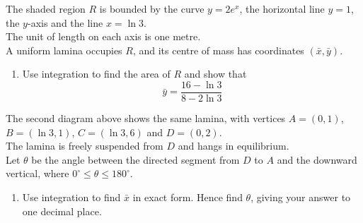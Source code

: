 \documentclass[leqno]{article}
\begin{document}
\begin{enumerate}[
  label=\textbf{\arabic*.},
  leftmargin=*,
  topsep=0pt,
  partopsep=0pt,
  parsep=0pt
]
\begin{figure}[H]
    \centering
{}
\end{figure}


The shaded region $R$ is bounded by the curve $y=2e^x$, the horizontal line $y=1$, the $y$-axis and the line $x=\ln 3$. \\
The unit of length on each axis is one metre. \\

A uniform lamina occupies $R$, and its centre of mass has coordinates $(\bar{x},\bar{y})$. \\
\begin{enumerate}[label=\textbf{(\alph*)}]
\item Use integration to find the area of $R$ and show that
\[
\bar{y}=\dfrac{16-\ln 3}{8-2\ln 3}
\] 
\end{enumerate}
The second diagram above shows the same lamina, with vertices $A=(0,1)$, $B=(\ln 3,1)$, $C=(\ln 3,6)$ and $D=(0,2)$. \\

The lamina is freely suspended from $D$ and hangs in equilibrium. \\
Let $\theta$ be the angle between the directed segment from $D$ to $A$ and the downward vertical, where $0^\circ\leq\theta\leq180^\circ$. \\
\begin{enumerate}[label=\textbf{(\alph*)}, resume]
\item Use integration to find $\bar{x}$ in exact form. Hence find $\theta$, giving your answer to one decimal place.  \\
\end{enumerate}

\vspace*{10pt}


\end{enumerate}
\end{document}
